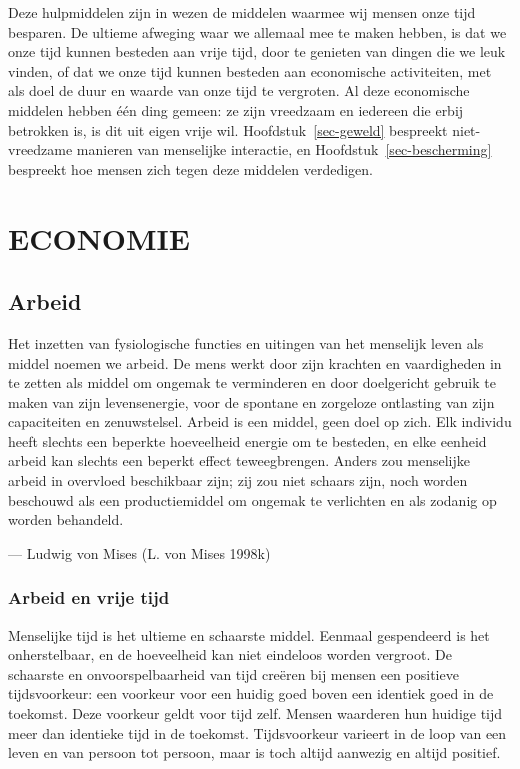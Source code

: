 \documentclass[
  a5paper,
  smalldemyvopaper,11pt,twoside,onecolumn,openright,extrafontsizes,
hidelinks]{memoir}
\begin{document}
Deze hulpmiddelen zijn in wezen de middelen waarmee wij mensen onze tijd
besparen. De ultieme afweging waar we allemaal mee te maken hebben, is
dat we onze tijd kunnen besteden aan vrije tijd, door te genieten van
dingen die we leuk vinden, of dat we onze tijd kunnen besteden aan
economische activiteiten, met als doel de duur en waarde van onze tijd
te vergroten. Al deze economische middelen hebben één ding gemeen: ze
zijn vreedzaam en iedereen die erbij betrokken is, is dit uit eigen
vrije wil. Hoofdstuk~\ref{sec-geweld} bespreekt niet-vreedzame manieren
van menselijke interactie, en Hoofdstuk~\ref{sec-bescherming} bespreekt
hoe mensen zich tegen deze middelen verdedigen.

\part{ECONOMIE}

\chapter{Arbeid}\label{sec-arbeid}

Het inzetten van fysiologische functies en uitingen van het menselijk
leven als middel noemen we arbeid. De mens werkt door zijn krachten en
vaardigheden in te zetten als middel om ongemak te verminderen en door
doelgericht gebruik te maken van zijn levensenergie, voor de spontane en
zorgeloze ontlasting van zijn capaciteiten en zenuwstelsel. Arbeid is
een middel, geen doel op zich. Elk individu heeft slechts een beperkte
hoeveelheid energie om te besteden, en elke eenheid arbeid kan slechts
een beperkt effect teweegbrengen. Anders zou menselijke arbeid in
overvloed beschikbaar zijn; zij zou niet schaars zijn, noch worden
beschouwd als een productiemiddel om ongemak te verlichten en als
zodanig op worden behandeld.

--- Ludwig von Mises (L. von Mises 1998k)

\section{Arbeid en vrije tijd}\label{arbeid-en-vrije-tijd}

Menselijke tijd is het ultieme en schaarste middel. Eenmaal gespendeerd
is het onherstelbaar, en de hoeveelheid kan niet eindeloos worden
vergroot. De schaarste en onvoorspelbaarheid van tijd creëren bij mensen
een positieve tijdsvoorkeur: een voorkeur voor een huidig goed boven een
identiek goed in de toekomst. Deze voorkeur geldt voor tijd zelf. Mensen
waarderen hun huidige tijd meer dan identieke tijd in de toekomst.
Tijdsvoorkeur varieert in de loop van een leven en van persoon tot
persoon, maar is toch altijd aanwezig en altijd positief.
\end{document}
